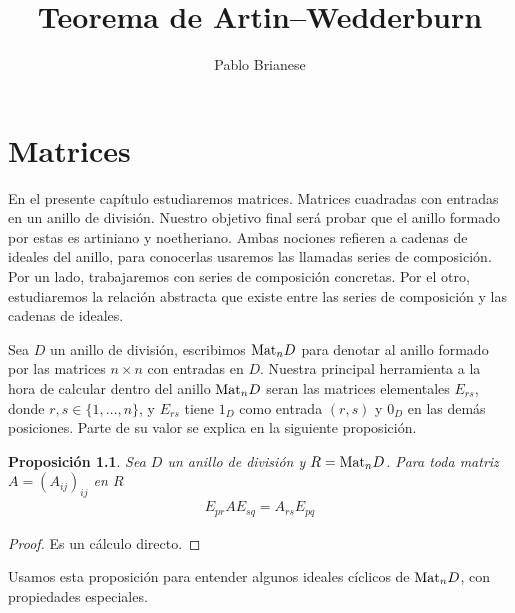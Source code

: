 \documentclass{report}
\title{Teorema de Artin--Wedderburn}
\author{Pablo Brianese}
\newcommand{\Mat}{\textnormal{Mat}}
\newtheorem{proposition}{Proposición}
\begin{document}
  \maketitle
  \tableofcontents
  \chapter{Matrices}

  En el presente capítulo estudiaremos matrices.
  Matrices cuadradas con entradas en un anillo de división.
  Nuestro objetivo final será probar que el anillo formado por estas es artiniano y noetheriano.
  Ambas nociones refieren a cadenas de ideales del anillo, para conocerlas usaremos las llamadas series de composición.
  Por un lado, trabajaremos con series de composición concretas.
  Por el otro, estudiaremos la relación abstracta que existe entre las series de composición y las cadenas de ideales.

  Sea \(D\) un anillo de división, escribimos \(\Mat_n D\) para denotar al anillo formado por las matrices \(n \times n\) con entradas en \(D\).
  Nuestra principal herramienta a la hora de calcular dentro del anillo \(\Mat_n D\) seran las matrices elementales \(E_{r s}\), donde \(r, s \in \{1, \dots, n\}\), y \(E_{r s}\) tiene \(1_D\) como entrada \((r, s)\) y \(0_D\) en las demás posiciones.
  Parte de su valor se explica en la siguiente proposición.
  \begin{proposition}\label{proposition:matrixEntryCalculation}
    Sea \(D\) un anillo de división y \(R = \Mat_n D\).
    Para toda matriz \(A = {(A_{i j})}_{i j}\) en \(R\)
    \begin{align}
      E_{p r} A E_{s q}
      =
      A_{r s} E_{p q}
    \end{align}
  \end{proposition}
  \begin{proof}
    Es un cálculo directo.
  \end{proof}

  Usamos esta proposición para entender algunos ideales cíclicos de \(\Mat_n D\), con propiedades especiales.
\end{document}
